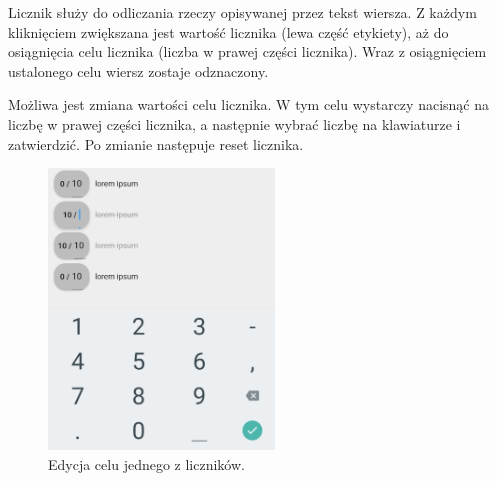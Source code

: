 Licznik służy do odliczania rzeczy opisywanej przez tekst wiersza. Z każdym kliknięciem zwiększana jest wartość licznika (lewa część etykiety), aż do osiągnięcia celu licznika (liczba w prawej części licznika). Wraz z osiągnięciem ustalonego celu wiersz zostaje odznaczony.

Możliwa jest zmiana wartości celu licznika. W tym celu wystarczy nacisnąć na liczbę w prawej części licznika, a następnie wybrać liczbę na klawiaturze i zatwierdzić. Po zmianie następuje reset licznika.


\begin{figure}[ht]
    \centering
    \includegraphics[width=6cm]{images/liczniki.png}
    \caption{Edycja celu jednego z liczników.}
    \vspace{3mm}
\end{figure}